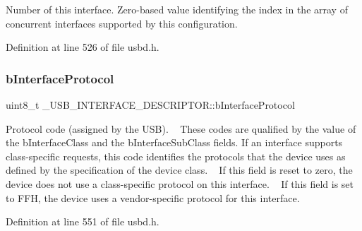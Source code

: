 Number of this interface. Zero-\/based value identifying the index in the array of concurrent interfaces supported by this configuration. 

Definition at line 526 of file usbd.\+h.

\mbox{\label{struct___u_s_b___i_n_t_e_r_f_a_c_e___d_e_s_c_r_i_p_t_o_r_a12f09e3be7c323bbd776f75af515ec7f}} 
\subsubsection{\texorpdfstring{b\+Interface\+Protocol}{bInterfaceProtocol}}
{\footnotesize\ttfamily uint8\+\_\+t \+\_\+\+U\+S\+B\+\_\+\+I\+N\+T\+E\+R\+F\+A\+C\+E\+\_\+\+D\+E\+S\+C\+R\+I\+P\+T\+O\+R\+::b\+Interface\+Protocol}

Protocol code (assigned by the U\+SB). ~\newline
These codes are qualified by the value of the b\+Interface\+Class and the b\+Interface\+Sub\+Class fields. If an interface supports class-\/specific requests, this code identifies the protocols that the device uses as defined by the specification of the device class. ~\newline
If this field is reset to zero, the device does not use a class-\/specific protocol on this interface. ~\newline
If this field is set to F\+FH, the device uses a vendor-\/specific protocol for this interface. 

Definition at line 551 of file usbd.\+h.

\mbox{\label{struct___u_s_b___i_n_t_e_r_f_a_c_e___d_e_s_c_r_i_p_t_o_r_af88328ec7f751751f3397df1c4c032b2}} 
